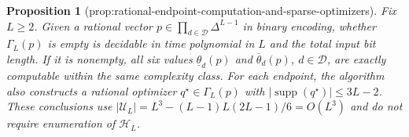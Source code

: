 \documentclass{article}
\newtheorem{proposition}{Proposition}
\begin{document}
\begin{proposition}[prop:rational-endpoint-computation-and-sparse-optimizers]\label{prop:rational-endpoint-computation-and-sparse-optimizers}
Fix \(L\ge2\).  Given a rational vector \(p\in\prod_{d\in\mathcal D}\Delta^{L-1}\) in binary encoding, whether \(\Gamma_L(p)\) is empty is decidable in time polynomial in \(L\) and the total input bit length.  If it is nonempty, all six values \(\underline\theta_d(p)\) and \(\overline\theta_d(p)\), \(d\in\mathcal D\), are exactly computable within the same complexity class.  For each endpoint, the algorithm also constructs a rational optimizer \(q^\star\in\Gamma_L(p)\) with \(|\operatorname{supp}(q^\star)|\le3L-2\).  These conclusions use \(|\mathcal U_L|=L^3-(L-1)L(2L-1)/6=O(L^3)\) and do not require enumeration of \(\mathcal H_L\).
\end{proposition}
\end{document}
